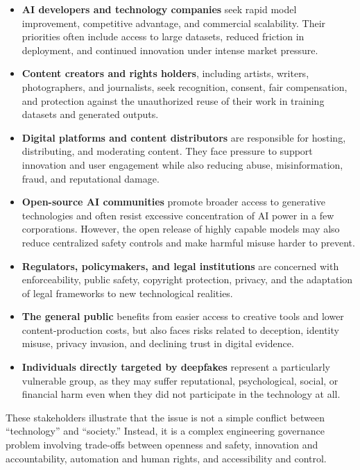 \begin{itemize}
  \item \textbf{AI developers and technology companies} seek rapid model improvement, competitive advantage, and commercial scalability. Their priorities often include access to large datasets, reduced friction in deployment, and continued innovation under intense market pressure.

  \item \textbf{Content creators and rights holders}, including artists, writers, photographers, and journalists, seek recognition, consent, fair compensation, and protection against the unauthorized reuse of their work in training datasets and generated outputs.

  \item \textbf{Digital platforms and content distributors} are responsible for hosting, distributing, and moderating content. They face pressure to support innovation and user engagement while also reducing abuse, misinformation, fraud, and reputational damage.

  \item \textbf{Open-source AI communities} promote broader access to generative technologies and often resist excessive concentration of AI power in a few corporations. However, the open release of highly capable models may also reduce centralized safety controls and make harmful misuse harder to prevent.

  \item \textbf{Regulators, policymakers, and legal institutions} are concerned with enforceability, public safety, copyright protection, privacy, and the adaptation of legal frameworks to new technological realities.

  \item \textbf{The general public} benefits from easier access to creative tools and lower content-production costs, but also faces risks related to deception, identity misuse, privacy invasion, and declining trust in digital evidence.

  \item \textbf{Individuals directly targeted by deepfakes} represent a particularly vulnerable group, as they may suffer reputational, psychological, social, or financial harm even when they did not participate in the technology at all.
\end{itemize}

These stakeholders illustrate that the issue is not a simple conflict between ``technology'' and ``society.'' Instead, it is a complex engineering governance problem involving trade-offs between openness and safety, innovation and accountability, automation and human rights, and accessibility and control.

